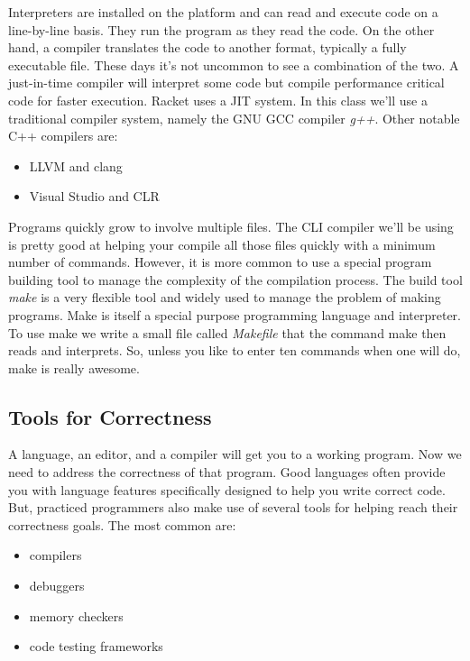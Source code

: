 \documentclass[nobib]{tufte-handout}
\begin{document}
Interpreters are installed on the platform and can read and execute code on a line-by-line basis. They run the program as they read the code. On the other hand, a compiler translates the code to another format, typically a fully executable file. These days it's not uncommon to see a combination of the two. A just-in-time compiler will interpret some code but compile performance critical code for faster execution. Racket uses a JIT system.  In this class we'll use a traditional compiler system, namely the GNU GCC compiler \textit{g++}. Other notable C++ compilers are:
\begin{itemize}
\item LLVM and clang 
\item Visual Studio and CLR 
\end{itemize}

Programs quickly grow to involve multiple files. The CLI compiler we'll be using is pretty good at helping your compile all those files quickly with a minimum number of commands. However, it is more common to use a special program building tool to manage the complexity of the compilation process. The build tool \textit{make} is a very flexible tool and widely used to manage the problem of making programs.  Make is itself a special purpose programming language and interpreter. To use make we write a small file called \textit{Makefile} that the command make then reads and interprets.  So, unless you like to enter ten commands when one will do, make is really awesome.



\subsection{Tools for Correctness}

A language, an editor, and a compiler will get you to a working program. Now we need to address the correctness of that program. Good languages often provide you with language features specifically designed to help you write correct code. But, practiced programmers also make use of several tools for helping reach their correctness goals.  The most common are:
\begin{itemize}
\item compilers
\item debuggers
\item memory checkers
\item code testing frameworks
\end{itemize}
\end{document}
